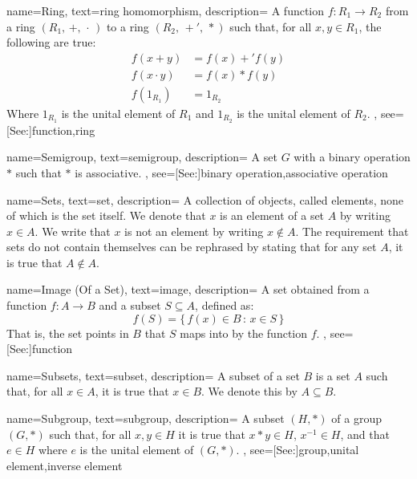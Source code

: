 {
    name={Ring},
    text={ring homomorphism},
    description={
        A function $f:R_{1}\rightarrow{R}_{2}$ from a ring
        $(R_{1},\,+,\,\cdot\,)$ to a ring $(R_{2},\,+',\,*)$ such that,
        for all $x,y\in{R}_{1}$, the following are true:
        {%
            \begin{align*}
                f(x+y)&=f(x)+'f(y)\\
                f(x\cdot{y})&=f(x)*f(y)\\
                f(1_{R_{1}})&=1_{R_{2}}
            \end{align*}
        }%
        Where $1_{R_{1}}$ is the unital element of $R_{1}$ and
        $1_{R_{2}}$ is the unital element of $R_{2}$.
    },
    see=[See:]{function,ring}
}

{
    name={Semigroup},
    text={semigroup},
    description={
        A set $G$ with a binary operation $*$ such that $*$ is associative.
    },
    see=[See:]{binary operation,associative operation}
}

{
    name={Sets},
    text={set},
    description={
        A collection of objects, called elements, none of which is the set
        itself. We denote that $x$ is an element of a set $A$ by writing
        $x\in{A}$. We write that $x$ is not an element by writing
        $x\notin{A}$. The requirement that sets do not contain themselves can
        be rephrased by stating that for any set $A$, it is true that
        $A\notin{A}$.
    }
}

{
    name={Image (Of a Set)},
    text={image},
    description={
        A set obtained from a function $f:A\rightarrow{B}$
        and a subset $S\subseteq{A}$, defined as:
        \begin{equation*}
            f(S)=\{\,f(x)\in{B}\,:\,x\in{S}\,\}
        \end{equation*}
        That is, the set points in $B$ that $S$ maps into by the function $f$.
    },
    see=[See:]{function}
}

{
    name={Subsets},
    text={subset},
    description={
        A subset of a set $B$ is a set $A$ such that, for all $x\in{A}$, it is
        true that $x\in{B}$. We denote this by $A\subseteq{B}$.
    }
}

{
    name={Subgroup},
    text={subgroup},
    description={
        A subset $(H,*)$ of a group $(G,*)$ such that, for all $x,y\in{H}$ it
        is true that $x*y\in{H}$, $x^{\minus{1}}\in{H}$, and that $e\in{H}$ where
        $e$ is the unital element of $(G,*)$.
    },
    see=[See:]{group,unital element,inverse element}
}

